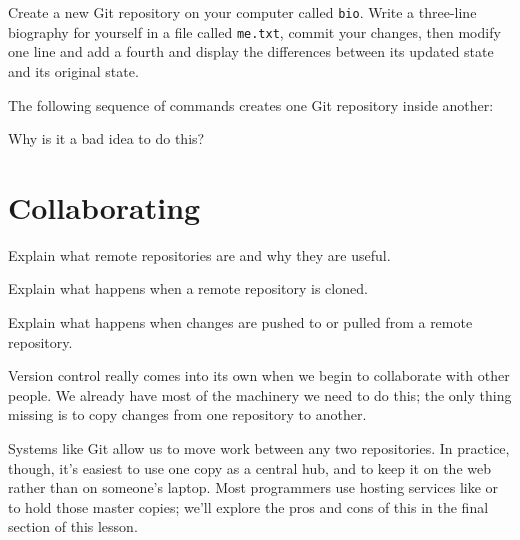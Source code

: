 \documentclass{book}
\begin{document}
\begin{challenge}
  Create a new Git repository on your computer called \texttt{bio}.
  Write a three-line biography for yourself in a file called
  \texttt{me.txt}, commit your changes, then modify one line and add a
  fourth and display the differences between its updated state and its
  original state.
\end{challenge}

\begin{challenge}
  The following sequence of commands creates one Git repository inside
  another:


  Why is it a bad idea to do this?
\end{challenge}

\section{Collaborating}

\begin{objectives}
\begin{swcitemize}
\item
  Explain what remote repositories are and why they are useful.
\item
  Explain what happens when a remote repository is cloned.
\item
  Explain what happens when changes are pushed to or pulled from a
  remote repository.
\end{swcitemize}
\end{objectives}

Version control really comes into its own when we begin to collaborate
with other people. We already have most of the machinery we need to do
this; the only thing missing is to copy changes from one repository to
another.

Systems like Git allow us to move work between any two repositories. In
practice, though, it's easiest to use one copy as a central hub, and to
keep it on the web rather than on someone's laptop. Most programmers use
hosting services like  or
 to hold those master copies;
we'll explore the pros and cons of this in the final section of this
lesson.
\end{document}
